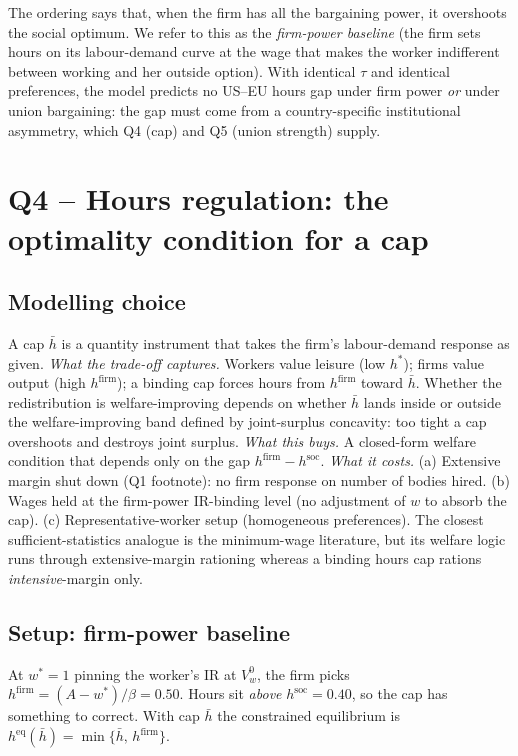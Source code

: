 \documentclass[a4paper,11pt]{article}
\begin{document}
The ordering says that, when the firm has all the bargaining power, it overshoots the social optimum. We refer to this as the \emph{firm-power baseline} (the firm sets hours on its labour-demand curve at the wage that makes the worker indifferent between working and her outside option). With identical $\tau$ and identical preferences, the model predicts no US--EU hours gap under firm power \emph{or} under union bargaining: the gap must come from a country-specific institutional asymmetry, which Q4 (cap) and Q5 (union strength) supply.

\section{Q4 -- Hours regulation: the optimality condition for a cap}


\subsection{Modelling choice}
A cap $\bar h$ is a quantity instrument that takes the firm's labour-demand response as given. \emph{What the trade-off captures.} Workers value leisure (low $h^*$); firms value output (high $h^{\mathrm{firm}}$); a binding cap forces hours from $h^{\mathrm{firm}}$ toward $\bar h$. Whether the redistribution is welfare-improving depends on whether $\bar h$ lands inside or outside the welfare-improving band defined by joint-surplus concavity: too tight a cap overshoots and destroys joint surplus. \emph{What this buys.} A closed-form welfare condition that depends only on the gap $h^{\mathrm{firm}}\!-\!h^{\mathrm{soc}}$. \emph{What it costs.} (a) Extensive margin shut down (Q1 footnote): no firm response on number of bodies hired. (b) Wages held at the firm-power IR-binding level (no adjustment of $w$ to absorb the cap). (c) Representative-worker setup (homogeneous preferences). The closest sufficient-statistics analogue is the minimum-wage literature, but its welfare logic runs through extensive-margin rationing whereas a binding hours cap rations \emph{intensive}-margin only.

\subsection{Setup: firm-power baseline}
At $w^*\!=\!1$ pinning the worker's IR at $V_w^0$, the firm picks $h^{\mathrm{firm}}\!=\!(A-w^*)/\beta\!=\!0.50$. Hours sit \emph{above} $h^{\mathrm{soc}}\!=\!0.40$, so the cap has something to correct. With cap $\bar h$ the constrained equilibrium is $h^{\mathrm{eq}}(\bar h)\!=\!\min\{\bar h,\,h^{\mathrm{firm}}\}$.
\end{document}
